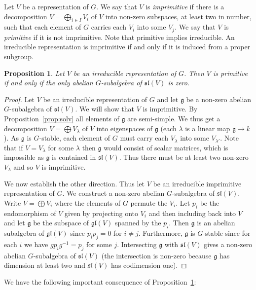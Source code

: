 \documentclass{amsart}
\newtheorem{proposition}[theorem]{Proposition}
\theoremstyle{definition}
\theoremstyle{remark}
\let\mf\mathfrak
\begin{document}
Let $V$ be a representation of $G$.  We say that $V$ is \emph{imprimitive}
if there is a decomposition $V=\bigoplus_{i \in I} V_i$ of $V$ into non-zero
subspaces, at least two in number, such that each element of $G$ carries each
$V_i$ into some $V_j$.  We say that $V$ is \emph{primitive} if it is not
imprimitive.  Note that primitive implies irreducible.  An irreducible
representation is imprimitive if and only if it is induced from a proper
subgroup.

\begin{proposition}
\label{prop:prim}
Let $V$ be an irreducible representation of $G$.  Then $V$ is primitive if
and only if the only abelian $G$-subalgebra of $\mf{sl}(V)$ is zero.
\end{proposition}

\begin{proof}
Let $V$ be an irreducible representation of $G$ and let $\mf{g}$ be a non-zero
abelian $G$-subalgebra of $\mf{sl}(V)$.  We will show that $V$ is
imprimitive.  By Proposition~\ref{prop:solv} all elements of $\mf{g}$ are
semi-simple.  We thus get a decomposition $V=\bigoplus V_{\lambda}$ of $V$ into
eigenspaces of $\mf{g}$ (each $\lambda$ is a linear map $\mf{g} \to k$).  As
$\mf{g}$ is $G$-stable, each element of $G$ must carry each $V_{\lambda}$ into
some $V_{\lambda'}$.  Note that if $V=V_{\lambda}$ for some $\lambda$
then $\mf{g}$ would consist of scalar matrices, which is impossible as $\mf{g}$
is contained in $\mf{sl}(V)$.  Thus there must be at least two non-zero
$V_{\lambda}$ and so $V$ is imprimitive.

We now establish the other direction.  Thus let $V$ be an irreducible
imprimitive representation of $G$.  We construct a non-zero abelian
$G$-subalgebra of $\mf{sl}(V)$.  Write $V=\bigoplus V_i$ where the elements of
$G$ permute the $V_i$.  Let $p_i$ be the endomorphism of $V$ given by
projecting onto $V_i$ and then including back into $V$ and let $\mf{g}$ be the
subspace of $\mf{gl}(V)$ spanned by the $p_i$.  Then $\mf{g}$ is an abelian
subalgebra of $\mf{gl}(V)$ since $p_i p_j=0$ for $i \ne j$.  Furthermore,
$\mf{g}$ is $G$-stable since for each $i$ we have $g p_i g^{-1}=p_j$ for some
$j$.  Intersecting $\mf{g}$ with $\mf{sl}(V)$ gives a non-zero abelian
$G$-subalgebra of $\mf{sl}(V)$ (the intersection is non-zero because $\mf{g}$
has dimension at least two and $\mf{sl}(V)$ has codimension one).
\end{proof}

We have the following important consequence of Proposition~\ref{prop:prim}:
\end{document}
